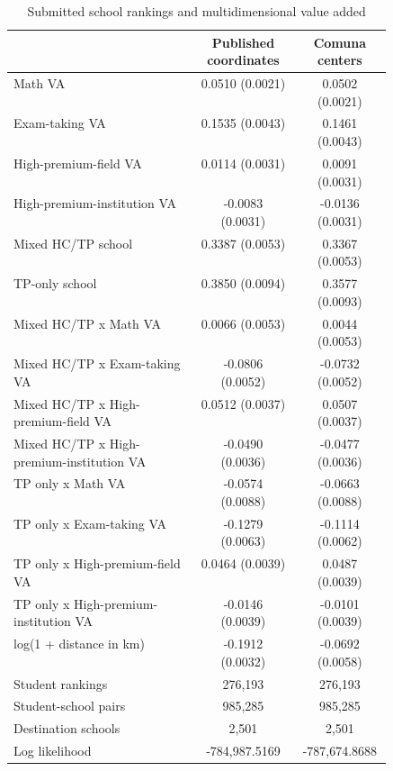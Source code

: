 \begin{table}[!htbp]
\centering
\caption{Submitted school rankings and multidimensional value added}
\label{tab:joint-rank-ordered-logit-va}
\small
\begin{tabular}{p{0.49\linewidth}cc}
\toprule
 & Published coordinates & Comuna centers \\
\midrule
Math VA & 0.0510 (0.0021) & 0.0502 (0.0021) \\
Exam-taking VA & 0.1535 (0.0043) & 0.1461 (0.0043) \\
High-premium-field VA & 0.0114 (0.0031) & 0.0091 (0.0031) \\
High-premium-institution VA & -0.0083 (0.0031) & -0.0136 (0.0031) \\
Mixed HC/TP school & 0.3387 (0.0053) & 0.3367 (0.0053) \\
TP-only school & 0.3850 (0.0094) & 0.3577 (0.0093) \\
Mixed HC/TP x Math VA & 0.0066 (0.0053) & 0.0044 (0.0053) \\
Mixed HC/TP x Exam-taking VA & -0.0806 (0.0052) & -0.0732 (0.0052) \\
Mixed HC/TP x High-premium-field VA & 0.0512 (0.0037) & 0.0507 (0.0037) \\
Mixed HC/TP x High-premium-institution VA & -0.0490 (0.0036) & -0.0477 (0.0036) \\
TP only x Math VA & -0.0574 (0.0088) & -0.0663 (0.0088) \\
TP only x Exam-taking VA & -0.1279 (0.0063) & -0.1114 (0.0062) \\
TP only x High-premium-field VA & 0.0464 (0.0039) & 0.0487 (0.0039) \\
TP only x High-premium-institution VA & -0.0146 (0.0039) & -0.0101 (0.0039) \\
log(1 + distance in km) & -0.1912 (0.0032) & -0.0692 (0.0058) \\
\midrule
Student rankings & 276,193 & 276,193 \\
Student-school pairs & 985,285 & 985,285 \\
Destination schools & 2,501 & 2,501 \\
Log likelihood & -784,987.5169 & -787,674.8688 \\
\bottomrule
\end{tabular}
\par\smallskip
\begin{minipage}{0.98\linewidth}\footnotesize

\end{minipage}
\end{table}
